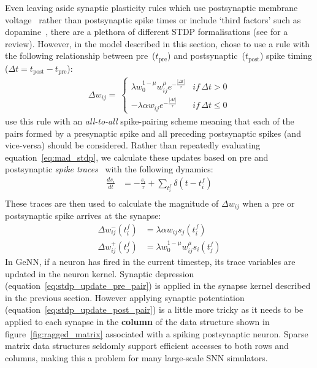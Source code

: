 \documentclass[utf8]{frontiersSCNS} %
\begin{document}
Even leaving aside synaptic plasticity rules which use postsynaptic membrane voltage~\citep{Brader2007,Clopath2010c} rather than postsynaptic spike times or include `third factors' such as dopamine~\citep{Izhikevich2007}, there are a plethora of different STDP formalisations (see \citet{Morrison2008} for a review).
However, in the model described in this section, \citet{Morrison2007} chose to use a rule with the following relationship between pre~($t_{\text{pre}}$) and postsynaptic~($t_{\text{post}}$) spike timing ($\Delta t = t_{\text{post}} - t_{\text{pre}}$):
%
\begin{align}
    \Delta w_{ij} = \
        \begin{cases}
            \lambda w_{0}^{1-\mu} w_{ij}^{\mu} e^{-\frac{|\Delta t|}{\tau}} & if\, \Delta t>0\\
            -\lambda \alpha w_{ij} e^{-\frac{|\Delta t|}{\tau}}             & if\, \Delta t\leq0
        \end{cases}\label{eq:mad_stdp}
\end{align}
%
\citet{Morrison2007} use this rule with an \textit{all-to-all} spike-pairing scheme meaning that each of the pairs formed by a presynaptic spike and all preceding postsynaptic spikes (and vice-versa) should be considered.
Rather than repeatedly evaluating equation~\ref{eq:mad_stdp}, we calculate these updates based on pre and postsynaptic \textit{spike traces}~\citep{Song2000, Morrison2007} with the following dynamics:
%
\begin{align}
    \frac{ds_{i}}{dt} & = -\frac{s_{i}}{\tau} + \sum_{t_{i}^{f}}\delta(t - t_{i}^{f}) \label{eq:stdp_trace}\\
\end{align}
%
These traces are then used to calculate the magnitude of $\Delta w_{ij}$ when a pre or postsynaptic spike arrives at the synapse:
%
\begin{align}
  \Delta w_{ij}^{-}(t_{i}^{f}) & = \lambda \alpha w_{ij} s_{j}(t_{i}^{f})\label{eq:stdp_update_pre_pair}\\
  \Delta w_{ij}^{+}(t_{j}^{f}) & = \lambda w_{0}^{1-\mu} w_{ij}^{\mu} s_{i}(t_{j}^{f})\label{eq:stdp_update_post_pair}
\end{align}
%
In GeNN, if a neuron has fired in the current timestep, its trace variables are updated in the neuron kernel.
Synaptic depression (equation~\ref{eq:stdp_update_pre_pair}) is applied in the synapse kernel described in the previous section.
However applying synaptic potentiation (equation~\ref{eq:stdp_update_post_pair}) is a little more tricky as it needs to be applied to each synapse in the \textbf{column} of the data structure shown in figure~\ref{fig:ragged_matrix} associated with a spiking postsynaptic neuron.
Sparse matrix data structures seldomly support efficient accesses to both rows and columns, making this a problem for many large-scale SNN simulators.
\end{document}

